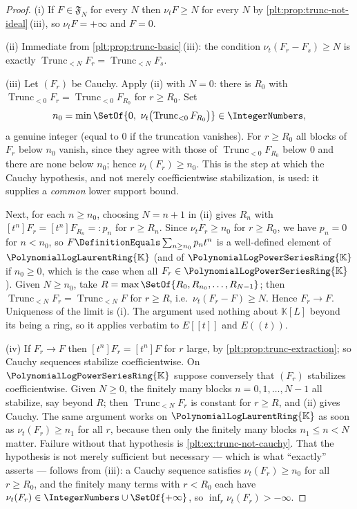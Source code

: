 \documentclass[11pt,oneside]{article}
\theoremstyle{plain}
\theoremstyle{definition}
\theoremstyle{remark}
\newcommand{\K}{\mathbb{K}}
\newcommand{\PLpow}{\PolynomialLogPowerSeriesRing{\K}}   %
\newcommand{\PLlau}{\PolynomialLogLaurentRing{\K}}       %
\newcommand{\ordt}{\nu_{t}}                              %
\newcommand{\Trunc}[2]{\operatorname{Trunc}_{<#2}#1}     %
\begin{document}
\begin{proof}
(i)  If \(F\in\mathfrak F_N\) for every \(N\) then \(\ordt F\ge N\) for every
\(N\) by \cref{plt:prop:trunc-not-ideal}\,(iii), so \(\ordt F=+\infty\) and
\(F=0\).

(ii)  Immediate from \cref{plt:prop:trunc-basic}\,(iii): the condition
\(\ordt(F_r-F_s)\ge N\) is exactly \(\Trunc{F_r}{N}=\Trunc{F_s}{N}\).

(iii)  Let \((F_r)\) be Cauchy.  Apply (ii) with \(N=0\): there is \(R_0\)
with \(\Trunc{F_r}{0}=\Trunc{F_{R_0}}{0}\) for \(r\ge R_0\).  Set
\[
  n_0=\min\SetOf{0,\ \ordt\bigl(\Trunc{F_{R_0}}{0}\bigr)}\in\IntegerNumbers ,
\]
a genuine integer (equal to \(0\) if the truncation vanishes).  For
\(r\ge R_0\) all blocks of \(F_r\) below \(n_0\) vanish, since they agree with
those of \(\Trunc{F_{R_0}}{0}\) below \(0\) and there are none below \(n_0\);
hence \(\ordt(F_r)\ge n_0\).  This is the step at which the Cauchy hypothesis,
and not merely coefficientwise stabilization, is used: it supplies a
\emph{common} lower support bound.

Next, for each \(n\ge n_0\), choosing \(N=n+1\) in (ii) gives \(R_n\) with
\([t^n]F_r=[t^n]F_{R_n}=:p_n\) for \(r\ge R_n\).  Since \(\ordt F_r\ge n_0\)
for \(r\ge R_0\), we have \(p_n=0\) for \(n<n_0\), so
\(F\DefinitionEquals\sum_{n\ge n_0}p_nt^n\) is a well-defined element of
\(\PLlau\) (and of \(\PLpow\) if \(n_0\ge0\), which is the case when all
\(F_r\in\PLpow\)).  Given \(N\ge n_0\), take \(R=\max\SetOf{R_0,R_{n_0},\dots,
R_{N-1}}\); then \(\Trunc{F_r}{N}=\Trunc{F}{N}\) for \(r\ge R\), i.e.\
\(\ordt(F_r-F)\ge N\).  Hence \(F_r\to F\).  Uniqueness of the limit is (i).
The argument used nothing about \(\K[L]\) beyond its being a ring, so it
applies verbatim to \(E[[t]]\) and \(E((t))\).

(iv)  If \(F_r\to F\) then \([t^n]F_r=[t^n]F\) for \(r\) large, by
\cref{plt:prop:trunc-extraction}; so Cauchy sequences stabilize
coefficientwise.  On \(\PLpow\) suppose conversely that \((F_r)\) stabilizes
coefficientwise.  Given \(N\ge0\), the finitely many blocks
\(n=0,1,\dots,N-1\) all stabilize, say beyond \(R\); then
\(\Trunc{F_r}{N}\) is constant for \(r\ge R\), and (ii) gives Cauchy.  The
same argument works on \(\PLlau\) as soon as \(\ordt(F_r)\ge n_1\) for all
\(r\), because then only the finitely many blocks \(n_1\le n<N\) matter.
Failure without that hypothesis is
\cref{plt:ex:trunc-not-cauchy}.
That the hypothesis is not merely sufficient but necessary --- which is what
``exactly'' asserts --- follows from (iii): a Cauchy sequence satisfies
\(\ordt(F_r)\ge n_0\) for all \(r\ge R_0\), and the finitely many terms with
\(r<R_0\) each have \(\ordt(F_r)\in\IntegerNumbers\cup\SetOf{+\infty}\), so
\(\inf_r\ordt(F_r)>-\infty\).
\end{proof}
\end{document}
